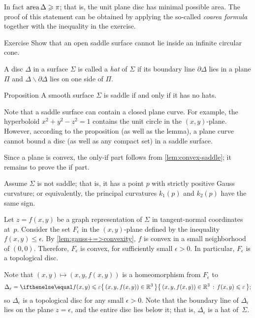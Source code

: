  In fact $\mathop{\rm area}\nolimits \Delta\geqslant \pi$;
that is, the unit plane disc has minimal possible area.
The proof of this statement can be obtained by applying the so-called \emph{coarea formula} together with the inequality in the exercise. 

\begin{thm}{Exercise}\label{ex:circular-cone-saddle}
Show that an open saddle surface
cannot lie inside an infinite circular cone. 
\end{thm}

A disc $\Delta$ in a surface $\Sigma$ is called a \emph{hat} of $\Sigma$
if its boundary line $\partial\Delta$ lies in a plane $\Pi$ and $\Delta \backslash \partial \Delta$ lies on one side of $\Pi$.

\begin{thm}{Proposition}\label{prop:hat}
A smooth surface $\Sigma$ is saddle if and only if it has no hats.
\end{thm}

Note that a saddle surface can contain a closed plane curve.
For example, the hyperboloid $x^2+y^2-z^2=1$ contains the unit circle in the $(x,y)$-plane.
However, according to the proposition (as well as the lemma), a plane curve cannot bound a disc (as well as any compact set) in a saddle surface.

Since a plane is convex, the only-if part follows from \ref{lem:convex-saddle};
it remains to prove the if part.

Assume $\Sigma$ is not saddle; that is, it has a point $p$ with strictly positive Gauss curvature;
or equivalently, the principal curvatures $k_1(p)$ and $k_2(p)$ have the same sign.


Let $z=f(x,y)$ be a graph representation of $\Sigma$ in tangent-normal coordinates at~$p$.
Consider the set $F_\epsilon$ in the $(x,y)$-plane defined by the inequality $f(x,y)\le \epsilon$.
By \ref{lem:gauss+=>convexity}, $f$ is convex in a small neighborhood of $(0,0)$.
Therefore, $F_\epsilon$ is convex, for sufficiently small $\epsilon>0$.
In particular, $F_\epsilon$ is a topological disc.

Note that $(x,y)\mapsto (x,y,f(x,y))$ is a homeomorphism from $F_\epsilon$
to
\[\Delta_\epsilon=\set{(x,y,f(x,y))\in \mathbb{R}^3}{f(x,y)\le \epsilon};\]
so $\Delta_\epsilon$ is a topological disc for any small $\epsilon>0$.
Note that the boundary line of $\Delta_\epsilon$ lies on the plane $z=\epsilon$, and the entire disc lies below it;
that is, $\Delta_\epsilon$ is a hat of~$\Sigma$.
\qeds

